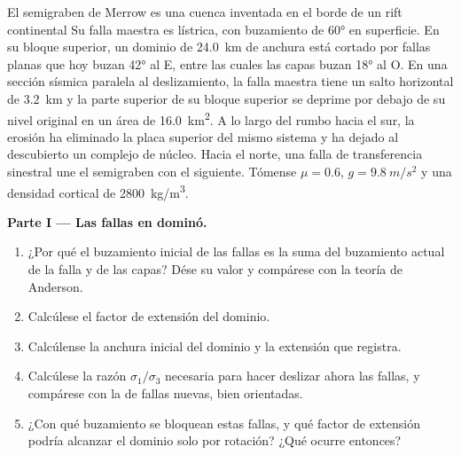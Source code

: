 \begin{problem}
\label{pb:b3:extension-strike-slip:1}
El semigraben de Merrow es una cuenca inventada en el borde de un rift continental
Su falla maestra es lístrica, con buzamiento de \ang{60} en superficie.
En su bloque superior, un dominio de \qty{24.0}{km} de anchura está cortado por fallas planas que hoy buzan
\ang{42} al E, entre las cuales las capas buzan \ang{18} al O. En una sección sísmica
paralela al deslizamiento, la falla maestra tiene un salto horizontal de \qty{3.2}{km} y la
parte superior de su bloque superior se deprime por debajo de su nivel original en un área de
\qty{16.0}{km^2}. A lo largo del rumbo hacia el sur, la erosión ha eliminado la
placa superior del mismo sistema y ha dejado al descubierto un complejo de núcleo. Hacia el norte, una
falla de transferencia sinestral une el semigraben con el siguiente. Tómense $\mu =
0.6$, $g = \qty{9.8}{m/s^2}$ y una densidad cortical de
\qty{2800}{kg/m^3}.

\medskip\noindent\textbf{Parte I --- Las fallas en dominó.}
\begin{enumerate}
  \item ¿Por qué el buzamiento inicial de las fallas es la suma del buzamiento actual de la falla y
        de las capas? Dése su valor y compárese con la teoría de Anderson.
  \item Calcúlese el factor de extensión del dominio.
  \item Calcúlense la anchura inicial del dominio y la extensión que registra.
  \item Calcúlese la razón $\sigma_1/\sigma_3$ necesaria para hacer deslizar ahora las fallas,
        y compárese con la de fallas nuevas, bien orientadas.
  \item ¿Con qué buzamiento se bloquean estas fallas, y qué factor de extensión podría
        alcanzar el dominio solo por rotación? ¿Qué ocurre entonces?
\end{enumerate}


\end{problem}
